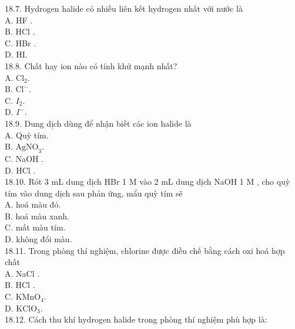 \documentclass[10pt]{article}
\begin{document}
18.7. Hydrogen halide có nhiều liên kết hydrogen nhất với nước là\\
A. HF .\\
B. HCl .\\
C. HBr .\\
D. HI.\\
18.8. Chất hay ion nào có tính khử mạnh nhất?\\
A. $\mathrm{Cl}_{2}$.\\
B. $\mathrm{Cl}^{-}$.\\
C. $I_{2}$.\\
D. $I^{-}$.\\
18.9. Dung dịch dùng để nhận biết các ion halide là\\
A. Quỳ tím.\\
B. $\mathrm{AgNO}_{3}$.\\
C. NaOH .\\
D. HCl .\\
18.10. Rót 3 mL dung dịch HBr 1 M vào 2 mL dung dịch NaOH 1 M , cho quỳ tím vào dung dịch sau phản ứng, mẩu quỳ tím sẽ\\
A. hoá màu đỏ.\\
B. hoá màu xanh.\\
C. mất màu tím.\\
D. không đổi màu.\\
18.11. Trong phòng thí nghiệm, chlorine được điều chế bằng cách oxi hoá hợp chất\\
A. NaCl .\\
B. HCl .\\
C. $\mathrm{KMnO}_{4}$.\\
D. $\mathrm{KClO}_{3}$.\\
18.12. Cách thu khí hydrogen halide trong phòng thí nghiệm phù hợp là:
\end{document}
